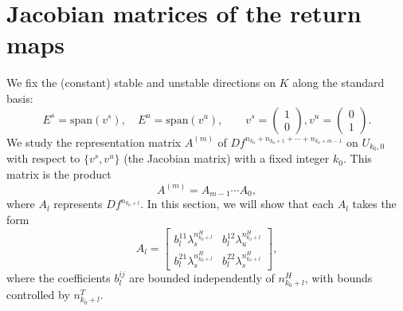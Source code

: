 \documentclass{amsart}
\theoremstyle{plain}
\theoremstyle{definition}
\theoremstyle{remark}
\numberwithin{equation}{section}
\begin{document}

\section{Jacobian matrices of the return maps}
\label{s:5}

We fix the (constant) stable and unstable directions on $K$ along the standard basis:
\[
    E^s = \mathrm{span}(v^s),\quad E^u = \mathrm{span}(v^u),\qquad v^s=\begin{pmatrix}1 \\ 0 \end{pmatrix},
    v^u=\begin{pmatrix}0 \\ 1 \end{pmatrix}.
\]
We study the representation matrix $A^{(m)}$ of $Df^{n_{k_0}+n_{k_0+1}+\cdots+n_{k_0+m-1}}$ on $U_{k_0,0}$ with respect to $\{v^s,v^u\}$ (the Jacobian matrix) with a fixed integer $k_0$.
This matrix is the product 
\[
A^{(m)}=A_{m-1}\cdots A_0,
\]
where $A_l$ represents $Df^{n_{k_0+l}}$.
In this section, we will show that each $A_l$ takes the form
\begin{equation*}
    A_l=\begin{bmatrix}
        b_l^{11}\lambda_s^{n_{k_0+l}^H} & b_l^{12}\lambda_u^{n_{k_0+l}^H}\\
        b_l^{21}\lambda_s^{n_{k_0+l}^H} & b_l^{22}\lambda_s^{n_{k_0+l}^H}
    \end{bmatrix},
\end{equation*}
where the coefficients $b_l^{ij}$ are bounded independently of $n_{k_0+l}^H$, 
with bounds controlled by $n_{k_0+l}^T$.
\end{document}
